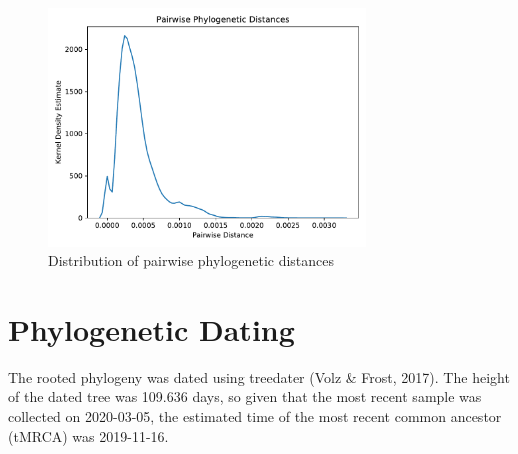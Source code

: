 \documentclass{article}
\begin{document}
\begin{figure}[h]
\centering
\includegraphics[width=0.75\textwidth,keepaspectratio]{./figs/pairwise_distances_tree.pdf}
\caption{Distribution of pairwise phylogenetic distances}
\end{figure}

\section{Phylogenetic Dating}
The rooted phylogeny was dated using treedater (Volz \& Frost, 2017).
The height of the dated tree was 109.636 days,
so given that the most recent sample was collected on 2020-03-05,
the estimated time of the most recent common ancestor (tMRCA) was 2019-11-16.
\end{document}
